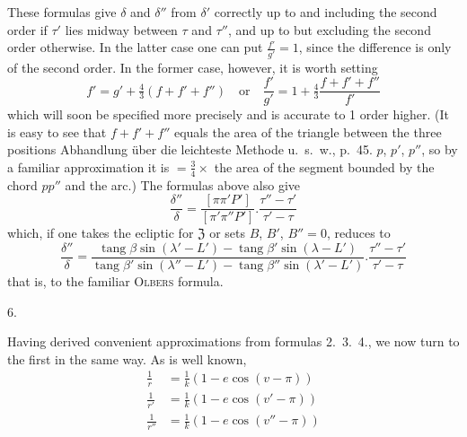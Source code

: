 These formulas give $\delta$ and $\delta''$ from $\delta'$ correctly up to and including the second order if $\tau'$ lies midway between $\tau$ and $\tau''$, and up to but excluding the second order otherwise. In the latter case one can put $\frac{f'}{g'}=1$, since the difference is only of the second order. In the former case, however, it is worth setting
\[
f'=g'+\tfrac43(f+f'+f'')\quad\text{or}\quad\frac{f'}{g'}=1+\tfrac43\frac{f+f'+f''}{f'}
\]
which will soon be specified more precisely and is accurate to 1 order higher. (It is easy to see that $f+f'+f''$ equals the area of the triangle between the three positions
%
\expandafter\def\csname HistoricalNoteText10\endcsname{Abhandlung über die leichteste Methode u.\ s.\ w., p.\ 45.}%
$p$, $p'$, $p''$, so by a familiar approximation it is $=\frac34\times$ the area of the segment bounded by the chord $pp''$ and the arc.) The formulas above also give
\[
\frac{\delta''}{\delta}=\frac{[\pi\pi'P']}{[\pi'\pi''P']}.\frac{\tau''-\tau'}{\tau'-\tau}
\]
which, if one takes the ecliptic for $\mathfrak{Z}$ or sets $B$, $B'$, $B''=0$, reduces to
\[
\frac{\delta''}{\delta}=\frac{\operatorname{tang}\beta\sin(\lambda'-L')-\operatorname{tang}\beta'\sin(\lambda-L')}{\operatorname{tang}\beta'\sin(\lambda''-L')-\operatorname{tang}\beta''\sin(\lambda'-L')}.\frac{\tau''-\tau'}{\tau'-\tau}
\]
that is, to the familiar \textsc{Olbers} formula.

\begin{center}6.\end{center}
Having derived convenient approximations from formulas 2.\ 3.\ 4., we now turn to the first in the same way. As is well known,
\[
\begin{aligned}
\frac1r&=\frac1k(1-e\cos(v-\pi))\\
\frac1{r'}&=\frac1k(1-e\cos(v'-\pi))\\
\frac1{r''}&=\frac1k(1-e\cos(v''-\pi))
\end{aligned}
\]

